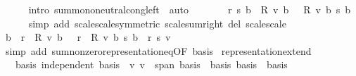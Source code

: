 \begin{isabellebody}
\ \ \ \ \isamarkupfalse%
\ {\isacharparenleft}{\kern0pt}intro\ sum{\isachardot}{\kern0pt}mono{\isacharunderscore}{\kern0pt}neutral{\isacharunderscore}{\kern0pt}cong{\isacharunderscore}{\kern0pt}left\ {\isacharasterisk}{\kern0pt}{\isacharparenright}{\kern0pt}\ auto\isanewline
\ \ \isamarkupfalse%
\ \isamarkupfalse%
\ {\isachardoublequoteopen}{\isachardot}{\kern0pt}{\isachardot}{\kern0pt}{\isachardot}{\kern0pt}\ {\isacharequal}{\kern0pt}\ r\ {\isacharasterisk}{\kern0pt}s\ {\isacharparenleft}{\kern0pt}{\isasymSum}b\ {\isacharbar}{\kern0pt}\ {\isacharquery}{\kern0pt}R\ v\ b\ {\isasymnoteq}\ {}{\isachardot}{\kern0pt}\ {\isacharquery}{\kern0pt}R\ v\ b\ {\isacharasterisk}{\kern0pt}s\ b{\isacharparenright}{\kern0pt}{\isachardoublequoteclose}\isanewline
\ \ \ \ \isamarkupfalse%
\ {\isacharparenleft}{\kern0pt}simp\ add{\isacharcolon}{\kern0pt}\ scale{\isacharunderscore}{\kern0pt}scale{\isacharbrackleft}{\kern0pt}symmetric{\isacharbrackright}{\kern0pt}\ scale{\isacharunderscore}{\kern0pt}sum{\isacharunderscore}{\kern0pt}right\ del{\isacharcolon}{\kern0pt}\ scale{\isacharunderscore}{\kern0pt}scale{\isacharparenright}{\kern0pt}\isanewline
\ \ \isamarkupfalse%
\ \isamarkupfalse%
\ {\isachardoublequoteopen}{\isacharparenleft}{\kern0pt}{\isasymSum}b\ {\isacharbar}{\kern0pt}\ r\ {\isacharasterisk}{\kern0pt}\ {\isacharquery}{\kern0pt}R\ v\ b\ {\isasymnoteq}\ {}{\isachardot}{\kern0pt}\ {\isacharparenleft}{\kern0pt}r\ {\isacharasterisk}{\kern0pt}\ {\isacharquery}{\kern0pt}R\ v\ b{\isacharparenright}{\kern0pt}\ {\isacharasterisk}{\kern0pt}s\ b{\isacharparenright}{\kern0pt}\ {\isacharequal}{\kern0pt}\ r\ {\isacharasterisk}{\kern0pt}s\ v{\isachardoublequoteclose}\isanewline
\ \ \ \ \isamarkupfalse%
\ {\isacharparenleft}{\kern0pt}simp\ add{\isacharcolon}{\kern0pt}\ sum{\isacharunderscore}{\kern0pt}nonzero{\isacharunderscore}{\kern0pt}representation{\isacharunderscore}{\kern0pt}eq{\isacharbrackleft}{\kern0pt}OF\ basis{\isacharbrackright}{\kern0pt}{\isacharparenright}{\kern0pt}\isanewline
{}\isamarkupfalse%
%
\endisatagproof
{\isafoldproof}%
%
\isadelimproof
\isanewline
%
\endisadelimproof
\isanewline
{}\isamarkupfalse%
\ representation{\isacharunderscore}{\kern0pt}extend{\isacharcolon}{\kern0pt}\isanewline
\ \ \ basis{\isacharcolon}{\kern0pt}\ {\isachardoublequoteopen}independent\ basis{\isachardoublequoteclose}\ \ v{\isacharcolon}{\kern0pt}\ {\isachardoublequoteopen}v\ {\isasymin}\ span\ basis{\isacharprime}{\kern0pt}{\isachardoublequoteclose}\ \ basis{\isacharprime}{\kern0pt}{\isacharcolon}{\kern0pt}\ {\isachardoublequoteopen}basis{\isacharprime}{\kern0pt}\ {\isasymsubseteq}\ basis{\isachardoublequoteclose}\isanewline

\end{isabellebody}
